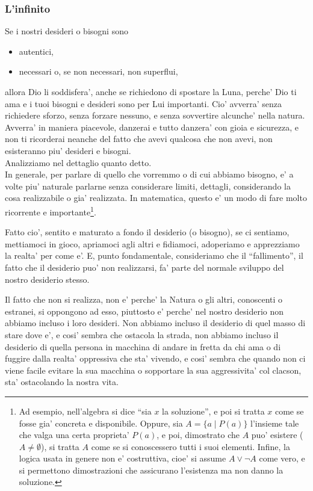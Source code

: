 \subsubsection{L'infinito}

Se i nostri desideri o bisogni sono 
\begin{itemize}
    \item autentici,
    \item necessari o, se non necessari, non superflui,
\end{itemize}
allora Dio li soddisfera', anche se richiedono di spostare la Luna, perche' Dio ti ama e i tuoi bisogni e desideri sono per Lui importanti. Cio' avverra' senza richiedere sforzo, senza forzare nessuno, e senza sovvertire alcunche' nella natura. Avverra' in maniera piacevole, danzerai e tutto danzera' con gioia e sicurezza, e non ti ricorderai neanche del fatto che avevi qualcosa che non avevi, non esisteranno piu' desideri e bisogni.\\

Analizziamo nel dettaglio quanto detto.\\

In generale, per parlare di quello che vorremmo o di cui abbiamo bisogno, e' a volte piu' naturale parlarne senza considerare limiti, dettagli, considerando la cosa realizzabile o gia' realizzata. In matematica, questo e' un modo di fare molto ricorrente e importante\footnote{Ad esempio, nell'algebra si dice ``sia $x$ la soluzione'', e poi si tratta $x$ come se fosse gia' concreta e disponibile. Oppure, sia $A=\{a \;|\;P(a)\}$ l'insieme tale che valga una certa proprieta' $P(a)$, e poi, dimostrato che $A$ puo' esistere ($A\neq \emptyset$), si tratta $A$ come se si conoscessero tutti i suoi elementi. Infine, la logica usata in genere non e' costruttiva, cioe' si assume $A \lor \lnot A$ come vero, e si permettono dimostrazioni che assicurano l'esistenza ma non danno la soluzione.}.

Fatto cio', sentito e maturato a fondo il desiderio (o bisogno), se ci sentiamo, mettiamoci in gioco, apriamoci agli altri e fidiamoci, adoperiamo e apprezziamo la realta' per come e'. E, punto fondamentale, consideriamo che il ``fallimento'', il fatto che il desiderio puo' non realizzarsi, fa' parte del normale sviluppo del nostro desiderio stesso. 

Il fatto che non si realizza, non e' perche' la Natura o gli altri, conoscenti o estranei, si oppongono ad esso, piuttosto e' perche' nel nostro desiderio non abbiamo incluso i loro desideri. Non abbiamo incluso il desiderio di quel masso di stare dove e', e cosi' sembra che ostacola la strada, non abbiamo incluso il desiderio di quella persona in macchina di andare in fretta da chi ama o di fuggire dalla realta' oppressiva che sta' vivendo, e cosi' sembra che quando non ci viene facile evitare la sua macchina o sopportare la sua aggressivita' col clacson, sta' ostacolando la nostra vita.

